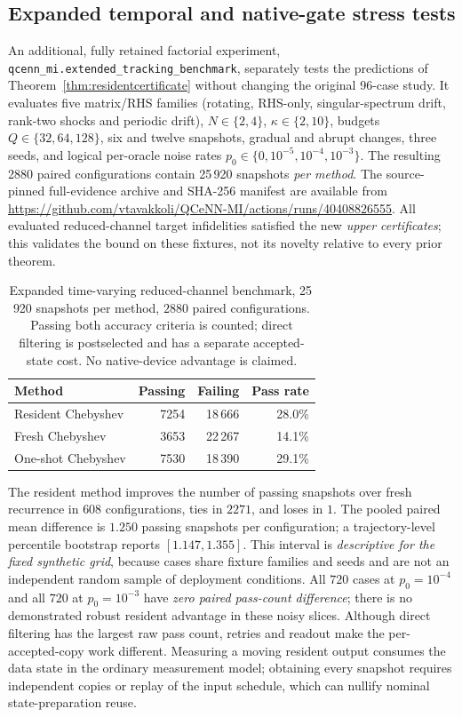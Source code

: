 \documentclass{ieeeaccess}
\begin{document}
\subsection{Expanded temporal and native-gate stress tests}
\label{sec:expandedtracking}
An additional, fully retained factorial experiment,
\texttt{qcenn\_mi.extended\_tracking\_benchmark}, separately
tests the predictions of Theorem~\ref{thm:residentcertificate}
without changing the original 96-case study. It evaluates five
matrix/RHS families (rotating, RHS-only, singular-spectrum drift,
rank-two shocks and periodic drift), $N\in\{2,4\}$,
$\kappa\in\{2,10\}$, budgets $Q\in\{32,64,128\}$,
six and twelve snapshots, gradual and abrupt changes, three seeds,
and logical per-oracle noise rates
$p_0\in\{0,10^{-5},10^{-4},10^{-3}\}$.
The resulting 2880 paired configurations contain 25\,920
snapshots \emph{per method}. The source-pinned full-evidence
archive and SHA-256 manifest are available from
\url{https://github.com/vtavakkoli/QCeNN-MI/actions/runs/40408826555}.
All evaluated reduced-channel target infidelities satisfied the
new \emph{upper certificates}; this validates the bound on these
fixtures, not its novelty relative to every prior theorem.

\begin{table}[!tbp]\centering\small
\caption{Expanded time-varying reduced-channel benchmark,
25\,920 snapshots per method, $2880$ paired configurations.
Passing both accuracy criteria is counted; direct filtering is
postselected and has a separate accepted-state cost.
No native-device advantage is claimed.}
\label{tab:expandedtemporal}
\begin{tabular}{lrrr}\toprule
Method & Passing & Failing & Pass rate\\\midrule
Resident Chebyshev & 7254 & 18\,666 & 28.0\%\\
Fresh Chebyshev & 3653 & 22\,267 & 14.1\%\\
One-shot Chebyshev & 7530 & 18\,390 & 29.1\%\\\bottomrule
\end{tabular}
\end{table}
The resident method improves the number of passing snapshots
over fresh recurrence in $608$ configurations, ties in $2271$,
and loses in $1$. The pooled paired mean difference is
$1.250$ passing snapshots per configuration; a trajectory-level
percentile bootstrap reports $[1.147,1.355]$.
This interval is \emph{descriptive for the fixed synthetic grid},
because cases share fixture families and seeds and are not an
independent random sample of deployment conditions. All
$720$ cases at $p_0=10^{-4}$ and all $720$ at $p_0=10^{-3}$
have \emph{zero paired pass-count difference}; there is no
demonstrated robust resident advantage in these noisy slices.
Although direct filtering has the largest raw pass count,
retries and readout make the per-accepted-copy work different.
Measuring a moving resident output consumes the data state in
the ordinary measurement model; obtaining every snapshot
requires independent copies or replay of the input schedule,
which can nullify nominal state-preparation reuse.
\end{document}
